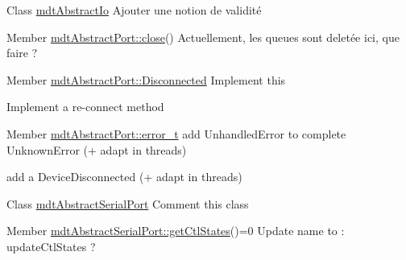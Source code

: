 \label{todo__todo000053}
\hypertarget{todo__todo000053}{}
 
\begin{DoxyDescription}
\item[Class \hyperlink{classmdt_abstract_io}{mdtAbstractIo} ]Ajouter une notion de validité 
\end{DoxyDescription}

\label{todo__todo000018}
\hypertarget{todo__todo000018}{}
 
\begin{DoxyDescription}
\item[Member \hyperlink{classmdt_abstract_port_a1ace1a2bd1a04f16952980e247b04800}{mdtAbstractPort::close}() ]Actuellement, les queues sont deletée ici, que faire ? 
\end{DoxyDescription}

\label{todo__todo000019}
\hypertarget{todo__todo000019}{}
 
\begin{DoxyDescription}
\item[Member \hyperlink{classmdt_abstract_port_ad4121bb930c95887e77f8bafa065a85ea8b70726d03f75a691ac4ad65722a5f3c}{mdtAbstractPort::Disconnected} ]Implement this 

Implement a re-\/connect method 
\end{DoxyDescription}

\label{todo__todo000017}
\hypertarget{todo__todo000017}{}
 
\begin{DoxyDescription}
\item[Member \hyperlink{classmdt_abstract_port_ad4121bb930c95887e77f8bafa065a85e}{mdtAbstractPort::error\_\-t} ]add UnhandledError to complete UnknownError (+ adapt in threads) 

add a DeviceDisconnected (+ adapt in threads) 
\end{DoxyDescription}

\label{todo__todo000047}
\hypertarget{todo__todo000047}{}
 
\begin{DoxyDescription}
\item[Class \hyperlink{classmdt_abstract_serial_port}{mdtAbstractSerialPort} ]Comment this class 
\end{DoxyDescription}

\label{todo__todo000048}
\hypertarget{todo__todo000048}{}
 
\begin{DoxyDescription}
\item[Member \hyperlink{classmdt_abstract_serial_port_aaeacd26b220ab0f8c521cef74edfafdd}{mdtAbstractSerialPort::getCtlStates}()=0 ]Update name to : updateCtlStates ? 
\end{DoxyDescription}

